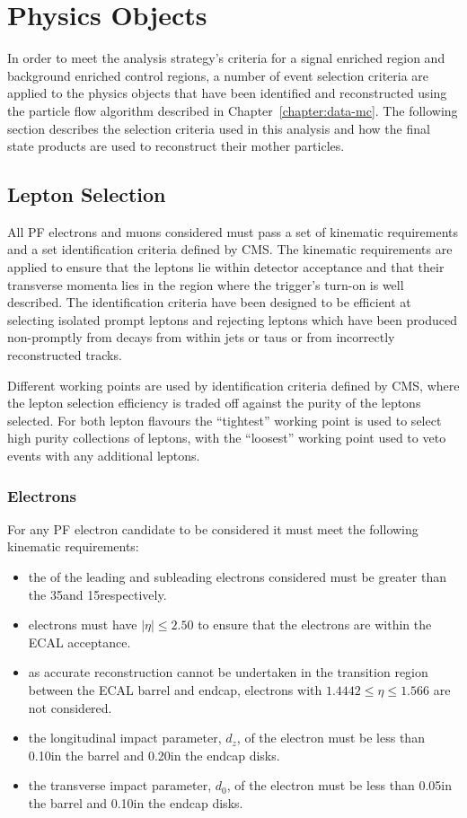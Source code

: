 \section{Physics Objects}\label{sec:physicsObjects}
In order to meet the analysis strategy's criteria for a signal enriched region and background enriched control regions, a number of event selection criteria are applied to the physics objects that have been identified and reconstructed using the particle flow algorithm described in Chapter~\ref{chapter:data-mc}.
The following section describes the selection criteria used in this analysis and how the final state products are used to reconstruct their mother particles.

\subsection{Lepton Selection}
All PF electrons and muons considered must pass a set of kinematic requirements and a set identification criteria defined by CMS.
The kinematic requirements are applied to ensure that the leptons lie within detector acceptance and that their transverse momenta lies in the region where the trigger's turn-on is well described.
The identification criteria have been designed to be efficient at selecting isolated prompt leptons and rejecting leptons which have been produced non-promptly from decays from within jets or taus or from incorrectly reconstructed tracks.

Different working points are used by identification criteria defined by CMS, where the lepton selection efficiency is traded off against the purity of the leptons selected.
For both lepton flavours the ``tightest'' working point is used to select high purity collections of leptons, with the ``loosest'' working point used to veto events with any additional leptons.

\subsubsection{Electrons}\label{subsubsec:electronSelection}
For any PF electron candidate to be considered it must meet the following kinematic requirements:

\begin{itemize}
\item the \pt of the leading and subleading electrons considered must be greater than the 35\GeVc and 15\GeVc respectively.
\item electrons must have $|\eta| \leq 2.50$ to ensure that the electrons are within the ECAL acceptance.
\item as accurate reconstruction cannot be undertaken in the transition region between the ECAL barrel and endcap, electrons with $1.4442 \leq \eta \leq 1.566$ are not considered.
\item the longitudinal impact parameter, $d_{z}$, of the electron must be less than 0.10\cm in the barrel and 0.20\cm in the endcap disks.
\item the transverse impact parameter, $d_{0}$, of the electron must be less than 0.05\cm in the barrel and 0.10\cm in the endcap disks.
\end{itemize}

